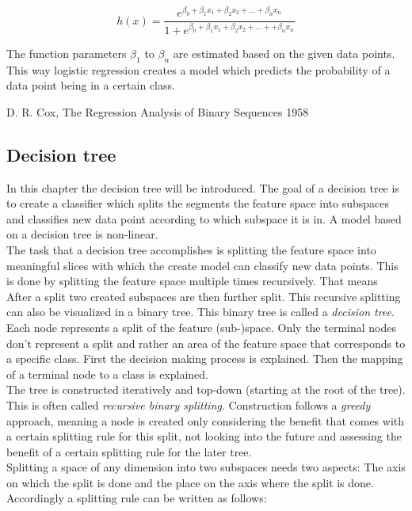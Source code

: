 \begin{equation} \label{eq:11}
h(x)=\frac{e^{\beta_0 + \beta_1 x_1 + \beta_2 x_2 + ... + \beta_n x_n}}{1+e^{\beta_0 + \beta_1 x_1 + \beta_2 x_2 + ... + + \beta_n x_n}}
\end{equation}

The function parameters $\beta_1$ to  $\beta_n$ are estimated based on the given data points.  \\
This way logistic regression creates a model which predicts the probability of a data point being in a certain class.

D. R. Cox, The Regression Analysis of Binary Sequences 1958
\subsection{Decision tree}

In this chapter the decision tree will be introduced. The goal of a decision tree is to create a classifier which splits the segments the feature space into subspaces and classifies new data point according to which subspace it is in. A model based on a decision tree is non-linear.
\\

The task that a decision tree accomplishes is splitting the feature space into meaningful slices with which the create model can classify new data points.
This is done by splitting the feature space multiple times recursively. That means After a split two created subspaces are then further split. This recursive splitting can also be visualized in a binary tree. This binary tree is called a \emph{decision tree}. Each node represents a split of the feature (sub-)space.  Only the terminal nodes don't represent a split and rather an area of the feature space that corresponds to a specific class. First the decision making process is explained. Then the mapping of a terminal node to a class is explained.
\\
The tree is constructed iteratively and top-down (starting at the root of the tree). This is often called \emph{recursive binary splitting}. Construction follows a \emph{greedy} approach, meaning a node is created only considering the benefit that comes with a certain splitting rule for this split, not looking into the future and assessing the benefit of a certain splitting rule for the later tree.
\\
Splitting a space of any dimension into two subspaces needs two aspects: The axis on which the split is done and the place on the axis where the split is done. Accordingly a splitting rule can be written as follows:


